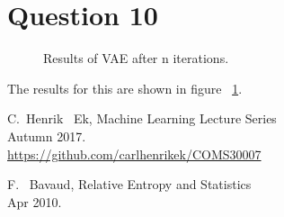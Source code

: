 \documentclass[]{article}
\begin{document}
    \section*{Question 10}
        \begin{figure}[h]
            \centering
            \caption{Results of VAE after n iterations.}
            \label{fig:q10}
        \end{figure}
        \par The results for this are shown in figure ~\ref{fig:q10}.


    \begin{thebibliography}{1}
    
        C.~Henrik ~Ek,  Machine Learning Lecture Series\\
        Autumn 2017. \\
        \url{https://github.com/carlhenrikek/COMS30007}

        F. ~Bavaud,  Relative Entropy and Statistics\\
        Apr 2010.
    
    \end{thebibliography}
    
    
\end{document}
